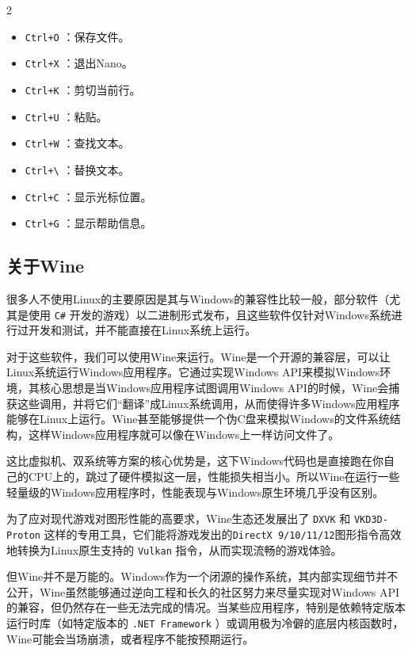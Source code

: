 \begin{multicols}{2}
  \begin{itemize}
    \item  \texttt{Ctrl+O} ：保存文件。
    \item  \texttt{Ctrl+X} ：退出Nano。
    \item  \texttt{Ctrl+K} ：剪切当前行。
    \item  \texttt{Ctrl+U} ：粘贴。
    \item  \texttt{Ctrl+W} ：查找文本。
    \item  \texttt{Ctrl+\textbackslash} ：替换文本。
    \item  \texttt{Ctrl+C} ：显示光标位置。
    \item  \texttt{Ctrl+G} ：显示帮助信息。
  \end{itemize}
\end{multicols}

\subsection{关于Wine}

很多人不使用Linux的主要原因是其与Windows的兼容性比较一般，部分软件（尤其是使用 \verb|C#| 开发的游戏）以二进制形式发布，且这些软件仅针对Windows系统进行过开发和测试，并不能直接在Linux系统上运行。

对于这些软件，我们可以使用Wine来运行。Wine是一个开源的兼容层，可以让Linux系统运行Windows应用程序。它通过实现Windows API来模拟Windows环境，其核心思想是当Windows应用程序试图调用Windows API的时候，Wine会捕获这些调用，并将它们“翻译”成Linux系统调用，从而使得许多Windows应用程序能够在Linux上运行。Wine甚至能够提供一个伪C盘来模拟Windows的文件系统结构，这样Windows应用程序就可以像在Windows上一样访问文件了。

这比虚拟机、双系统等方案的核心优势是，这下Windows代码也是直接跑在你自己的CPU上的，跳过了硬件模拟这一层，性能损失相当小。所以Wine在运行一些轻量级的Windows应用程序时，性能表现与Windows原生环境几乎没有区别。

为了应对现代游戏对图形性能的高要求，Wine生态还发展出了 \verb|DXVK| 和 \verb|VKD3D-Proton| 这样的专用工具，它们能将游戏发出的\verb|DirectX 9/10/11/12|图形指令高效地转换为Linux原生支持的 \verb|Vulkan| 指令，从而实现流畅的游戏体验。

但Wine并不是万能的。Windows作为一个闭源的操作系统，其内部实现细节并不公开，Wine虽然能够通过逆向工程和长久的社区努力来尽量实现对Windows API的兼容，但仍然存在一些无法完成的情况。当某些应用程序，特别是依赖特定版本运行时库（如特定版本的 \verb|.NET Framework| ）或调用极为冷僻的底层内核函数时，Wine可能会当场崩溃，或者程序不能按预期运行。

